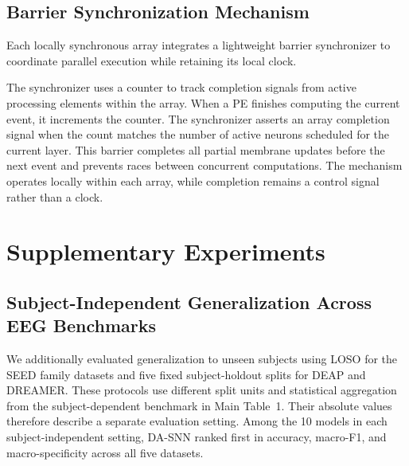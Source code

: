 ﻿\documentclass[12pt]{article}
\begin{document}
\subsection{Barrier Synchronization Mechanism}

Each locally synchronous array integrates a lightweight barrier synchronizer to coordinate parallel execution while retaining its local clock.

The synchronizer uses a counter to track completion signals from active processing elements within the array. When a PE finishes computing the current event, it increments the counter. The synchronizer asserts an array completion signal when the count matches the number of active neurons scheduled for the current layer. This barrier completes all partial membrane updates before the next event and prevents races between concurrent computations. The mechanism operates locally within each array, while completion remains a control signal rather than a clock.
\section{Supplementary Experiments}

\subsection{Subject-Independent Generalization Across EEG Benchmarks}\label{supp:cross_subject}

We additionally evaluated generalization to unseen subjects using LOSO for the SEED family datasets and five fixed subject-holdout splits for DEAP and DREAMER. These protocols use different split units and statistical aggregation from the subject-dependent benchmark in Main Table~1. Their absolute values therefore describe a separate evaluation setting. Among the 10 models in each subject-independent setting, DA-SNN ranked first in accuracy, macro-F1, and macro-specificity across all five datasets.
\end{document}

